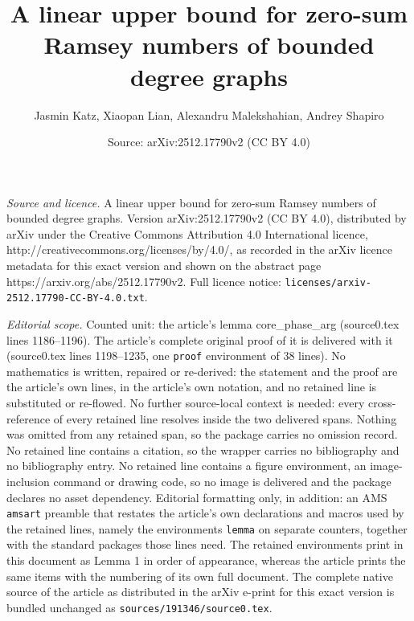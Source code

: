 \documentclass[10pt,a4paper]{amsart}
\title{A linear upper bound for zero-sum Ramsey numbers of bounded degree graphs}
\author{Jasmin Katz, Xiaopan Lian, Alexandru Malekshahian, Andrey Shapiro}
\date{Source: arXiv:2512.17790v2 (CC BY 4.0)}
\begin{document}
\maketitle

\noindent\emph{Source and licence.} A linear upper bound for zero-sum Ramsey numbers of bounded degree graphs. Version arXiv:2512.17790v2 (CC BY 4.0), distributed by arXiv under the Creative Commons Attribution 4.0 International licence, http://creativecommons.org/licenses/by/4.0/, as recorded in the arXiv licence metadata for this exact version and shown on the abstract page https://arxiv.org/abs/2512.17790v2. Full licence notice: \texttt{licenses/arxiv-2512.17790-CC-BY-4.0.txt}.\par\smallskip

\noindent\textit{Editorial scope.} Counted unit: the article's lemma core\_phase\_arg (source0.tex lines 1186--1196). The article's complete original proof of it is delivered with it (source0.tex lines 1198--1235, one \texttt{proof} environment of 38 lines). No mathematics is written, repaired or re-derived: the statement and the proof are the article's own lines, in the article's own notation, and no retained line is substituted or re-flowed.  No further source-local context is needed: every cross-reference of every retained line resolves inside the two delivered spans.  Nothing was omitted from any retained span, so the package carries no omission record.  No retained line contains a citation, so the wrapper carries no bibliography and no bibliography entry.  No retained line contains a figure environment, an image-inclusion command or drawing code, so no image is delivered and the package declares no asset dependency.  Editorial formatting only, in addition: an AMS \texttt{amsart} preamble that restates the article's own declarations and macros used by the retained lines, namely the environments \texttt{lemma} on separate counters, together with the standard packages those lines need.  The retained environments print in this document as Lemma 1 in order of appearance, whereas the article prints the same items with the numbering of its own full document.  The complete native source of the article as distributed in the arXiv e-print for this exact version is bundled unchanged as \texttt{sources/191346/source0.tex}.
\end{document}
